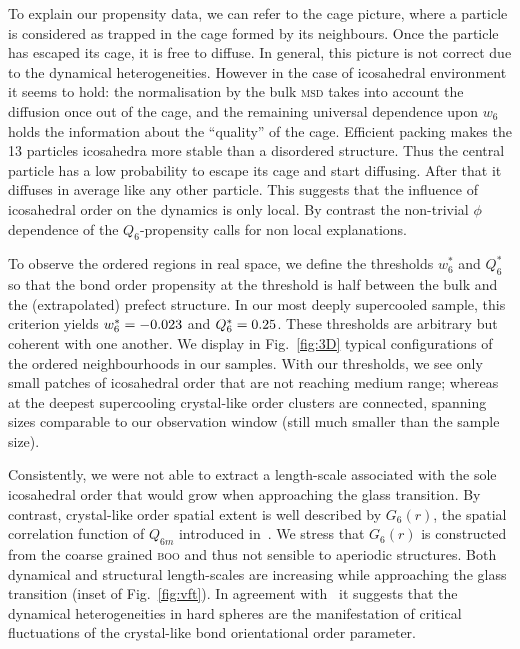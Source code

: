 To explain our propensity data, we can refer to the cage picture, where a particle is considered as trapped in the cage formed by its neighbours. Once the particle has escaped its cage, it is free to diffuse. In general, this picture is not correct due to the dynamical heterogeneities. However in the case of icosahedral environment it seems to hold: the normalisation by the bulk \textsc{msd} takes into account the diffusion once out of the cage, and the remaining universal dependence upon $w_6$ holds the information about the ``quality'' of the cage. Efficient packing makes the 13 particles icosahedra more stable than a disordered structure. Thus the central particle has a low probability to escape its cage and start diffusing. After that it diffuses in average like any other particle. This suggests that the influence of icosahedral order on the dynamics is only local. By contrast the non-trivial $\phi$ dependence of the $Q_6$-propensity calls for non local explanations.

To observe the ordered regions in real space, we define the thresholds $w_6^*$ and $Q_6^*$ so that the bond order propensity at the threshold is half between the bulk and the (extrapolated) prefect structure. In our most deeply supercooled sample, this criterion yields $w_6^* = -0.023$ and $Q_6^* = 0.25$. These thresholds are arbitrary but coherent with one another. We display in Fig.~\ref{fig:3D} typical configurations of the ordered neighbourhoods in our samples. With our thresholds, we see only small patches of icosahedral order that are not reaching medium range; whereas at the deepest supercooling crystal-like order clusters are connected, spanning sizes comparable to our observation window (still much smaller than the sample size).



Consistently, we were not able to extract a length-scale associated with the sole icosahedral order that would grow when approaching the glass transition. By contrast, crystal-like order spatial extent is well described by $G_6(r)$, the spatial correlation function of $Q_{6 m}$ introduced in~\citep{tanaka2010critical}. We stress that $G_6(r)$ is constructed from the coarse grained \textsc{boo} and thus not sensible to aperiodic structures. Both dynamical and structural length-scales are increasing while approaching the glass transition (inset of Fig.~\ref{fig:vft}). In agreement with~\citep{tanaka2010critical} it suggests that the dynamical heterogeneities in hard spheres are the manifestation of critical fluctuations of the crystal-like bond orientational order parameter.

